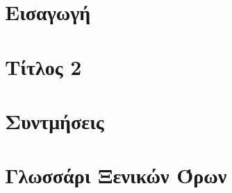 \documentclass[a4paper,11pt,oneside,openany]{ioniothesis}
\begin{document}
\renewcommand*\contentsname{Περιεχόμενα}
\renewcommand*\listfigurename{Κατάλογος Σχημάτων}
\renewcommand*\listtablename{Κατάλογος Πινάκων}
\renewcommand\bibname{Βιβλιογραφία}
\renewcommand\chaptername{Κεφάλαιο}
\renewcommand\tablename{Πίνακας}
\renewcommand\figurename{Σχήμα}

\tableofcontents

\cleardoublepage

\listoffigures
\cleardoublepage
\listoftables

\setlength{\parskip}{5pt}



\pagestyle{headings}
\cleardoublepage


\newpage
{}


\cleardoublepage


\chapter{Εισαγωγή} \label{chapter:intro}




\chapter{Τίτλος 2} \label{chapter:kefalaio-b}





\printbibliography %


\chapter*{Συντμήσεις} \pagestyle{empty}



\chapter*{Γλωσσάρι Ξενικών Όρων} \pagestyle{empty}






\newpage
{}
\printindex
\end{document}

